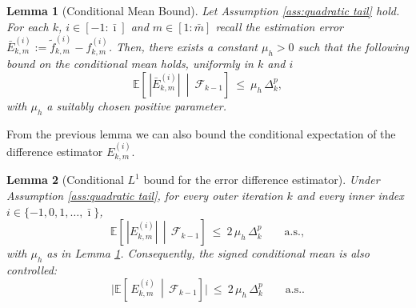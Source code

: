 \documentclass[11pt,a4paper]{article}
\newtheorem{lemma}{Lemma}[section]
\newcommand{\Imax}{\bar{\imath}}%
\newcommand{\Dexp}{p}
\newcommand{\sara}[1]{{\color{red}{\textbf{[SS: #1]}}\color{black}}}
\newcommand{\saraedit}[1]{{\color{red}{#1}\color{red}}}
\begin{document}
\begin{lemma}[Conditional Mean Bound]
\label{lem: conditional mean bound}
Let Assumption \ref{ass:quadratic tail} hold. For each $k$, $i\in[-1: \Imax]$ and $m\in[1:\bar{m}]$ recall the estimation error $\bar E_{k,m}^{(i)}:=\tilde f^{(i)}_{k,m} - f^{(i)}_{k,m}$. Then, there exists a constant $\mu_h>0$ such that the following bound on the conditional mean holds, uniformly in $k$ and $i$
\[
\mathbb{E}\!\left[\,|\bar E_{k,m}^{(i)}|\ \middle|\ \mathcal F_{k-1}\right]
\ \le\ \mu_h\,\Delta_k^{\Dexp},
\]
with $\mu_h$ a suitably chosen positive parameter.
\end{lemma}
From the previous lemma we can also bound the conditional expectation of the difference estimator $E_{k,m}^{(i)}$.
\begin{lemma}[Conditional $L^1$ bound for the error difference estimator]
\label{lem:diff-L1-from-A44}
Under Assumption \ref{ass:quadratic tail}, 
for every outer iteration $k$ and every inner index $i\in\{-1,0,1,\dots, \Imax\}$,
\begin{equation}\label{eq:diff-L1-core}
\mathbb E\!\left[\,|E_{k,m}^{(i)}|\,\middle|\,\mathcal F_{k-1}\right]
\ \le\ 2\,\mu_h\,\Delta_k^{\Dexp} \qquad \text{a.s.},
\end{equation}
with $\mu_h$ as in Lemma \ref{lem: conditional mean bound}. Consequently, the signed conditional mean is also controlled:
\begin{equation}\label{eq:diff-signed}
\big|\mathbb E\!\left[\,E_{k,m}^{(i)}\,\middle|\,\mathcal F_{k-1}\right]\big|
\ \le\ 2\,\mu_h\,\Delta_k^{\Dexp} \qquad \text{a.s.}.
\end{equation}
\end{lemma}
\end{document}
